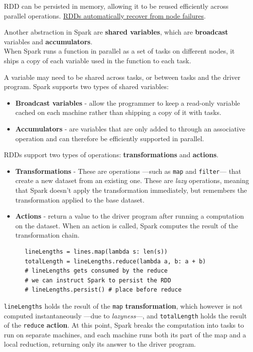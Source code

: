 RDD can be persisted in memory, allowing it to be reused efficiently across parallel operations.
\ul{RDDs automatically recover from node failures}.
\nl

Another abstraction in Spark are \textbf{shared variables}, which are \textbf{broadcast} variables and \textbf{accumulators}.\\
When Spark runs a function in parallel as a set of tasks on different nodes, it ships a copy of each variable used in the function to each task.
{A variable may need to be shared across tasks, or between tasks and the driver program. Spark supports two types of shared variables:\ns
\begin{itemize}
   \item \textbf{Broadcast variables} - allow the programmer to keep a read-only variable cached on each machine rather than shipping a copy of it with tasks.
   \item \textbf{Accumulators} - are variables that are only added to through an associative operation and can therefore be efficiently supported in parallel.
\end{itemize}}

{RDDs support two types of operations: \textbf{transformations} and \textbf{actions}.\ns
\begin{itemize}
   \item \textbf{Transformations} - These are operations ---such as \verb|map| and \verb|filter|--- that create a new dataset from an existing one. These are \textit{lazy} operations, meaning that Spark doesn't apply the transformation immediately, but remembers the transformation applied to the base dataset.
   \item \textbf{Actions} - return a value to the driver program after running a computation on the dataset.
   When an action is called, Spark computes the result of the transformation chain.
\end{itemize}}

\lstset{language=python}
\begin{paracol}{2}
   \begin{lstlisting}
      lineLengths = lines.map(lambda s: len(s))
      totalLength = lineLengths.reduce(lambda a, b: a + b)
      # lineLengths gets consumed by the reduce
      # we can instruct Spark to persist the RDD
      # lineLengths.persist() # place before reduce

   \end{lstlisting}
   
   \switchcolumn

   \verb|lineLengths| holds the result of the \verb|map| \textbf{transformation}, which however is not computed instantaneously ---due to \textit{lazyness}---, and \lstinline|totalLength| holds the result of the \verb|reduce| \textbf{action}.
   At this point, 
   Spark breaks the computation into tasks to run on
   separate machines, and each machine runs both its part of the map and a local reduction, returning only its answer to the driver program.
\end{paracol}


